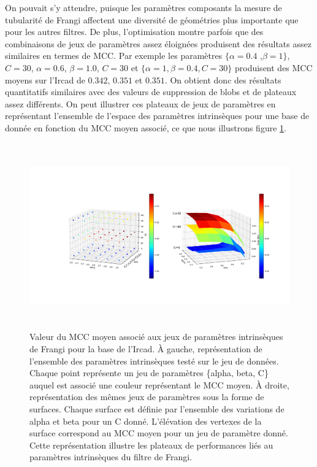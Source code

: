 On pouvait s'y attendre, puisque les paramètres composants la mesure de tubularité de Frangi affectent une diversité de géométries plus importante  que pour les autres filtres. De plus, l'optimisation montre parfois que des combinaisons de jeux de paramètres assez éloignées produisent des résultats assez similaires en termes de MCC. Par exemple les paramètres $\{\alpha=0.4$ ,$\beta=1\}$, $C=30$, $\alpha=0.6$, $\beta=1.0$, $C=30$ et $\{\alpha=1,\beta=0.4,C=30\}$ produisent des MCC moyens sur l'Ircad de $0.342$, $0.351$ et $0.351$. On obtient donc des résultats quantitatifs similaires avec des valeurs de suppression de blobs et de plateaux assez différents. On peut illustrer ces plateaux de jeux de paramètres en représentant l'ensemble de l'espace des paramètres intrinsèques pour une base de donnée en fonction du MCC moyen associé, ce que nous illustrons figure \ref{fig:frangi_params}. 
\begin{figure}[!ht]
  \centering
  \includegraphics[height=8cm]{Images/frangi_params.png}
  \caption{Valeur du MCC moyen associé aux jeux de paramètres intrinsèques de Frangi pour la base de l'Ircad. À gauche, représentation de l'ensemble des paramètres intrinsèques testé sur le jeu de données. Chaque point représente un jeu de paramètres \{alpha, beta, C\} auquel est associé une couleur représentant le MCC moyen. À droite, représentation des mêmes jeux de paramètres sous la forme de surfaces. Chaque surface est définie par l'ensemble des variations de alpha et beta pour un C donné. L'élévation des vertexes de la surface correspond au MCC moyen pour un jeu de paramètre donné. Cette représentation illustre les plateaux de performances liés au paramètres intrinsèques du filtre de Frangi.}
  \label{fig:frangi_params}
\end{figure}

